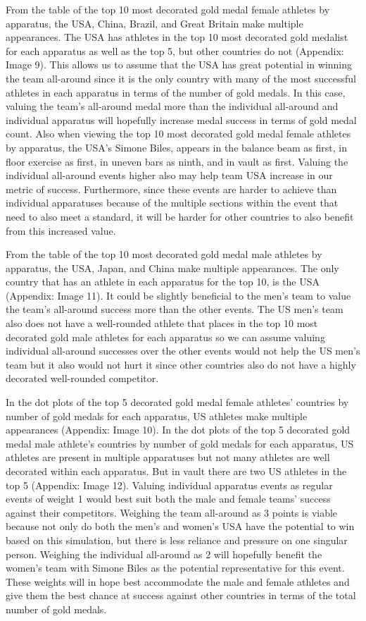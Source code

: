 \documentclass[
  letterpaper,
  DIV=11,
  numbers=noendperiod]{scrartcl}
\begin{document}
From the table of the top 10 most decorated gold medal female athletes
by apparatus, the USA, China, Brazil, and Great Britain make multiple
appearances. The USA has athletes in the top 10 most decorated gold
medalist for each apparatus as well as the top 5, but other countries do
not (Appendix: Image 9). This allows us to assume that the USA has great
potential in winning the team all-around since it is the only country
with many of the most successful athletes in each apparatus in terms of
the number of gold medals. In this case, valuing the team's all-around
medal more than the individual all-around and individual apparatus will
hopefully increase medal success in terms of gold medal count. Also when
viewing the top 10 most decorated gold medal female athletes by
apparatus, the USA's Simone Biles, appears in the balance beam as first,
in floor exercise as first, in uneven bars as ninth, and in vault as
first. Valuing the individual all-around events higher also may help
team USA increase in our metric of success. Furthermore, since these
events are harder to achieve than individual apparatuses because of the
multiple sections within the event that need to also meet a standard, it
will be harder for other countries to also benefit from this increased
value.

From the table of the top 10 most decorated gold medal male athletes by
apparatus, the USA, Japan, and China make multiple appearances. The only
country that has an athlete in each apparatus for the top 10, is the USA
(Appendix: Image 11). It could be slightly beneficial to the men's team
to value the team's all-around success more than the other events. The
US men's team also does not have a well-rounded athlete that places in
the top 10 most decorated gold male athletes for each apparatus so we
can assume valuing individual all-around successes over the other events
would not help the US men's team but it also would not hurt it since
other countries also do not have a highly decorated well-rounded
competitor.

In the dot plots of the top 5 decorated gold medal female athletes'
countries by number of gold medals for each apparatus, US athletes make
multiple appearances (Appendix: Image 10). In the dot plots of the top 5
decorated gold medal male athlete's countries by number of gold medals
for each apparatus, US athletes are present in multiple apparatuses but
not many athletes are well decorated within each apparatus. But in vault
there are two US athletes in the top 5 (Appendix: Image 12). Valuing
individual apparatus events as regular events of weight 1 would best
suit both the male and female teams' success against their competitors.
Weighing the team all-around as 3 points is viable because not only do
both the men's and women's USA have the potential to win based on this
simulation, but there is less reliance and pressure on one singular
person. Weighing the individual all-around as 2 will hopefully benefit
the women's team with Simone Biles as the potential representative for
this event. These weights will in hope best accommodate the male and
female athletes and give them the best chance at success against other
countries in terms of the total number of gold medals.
\end{document}
